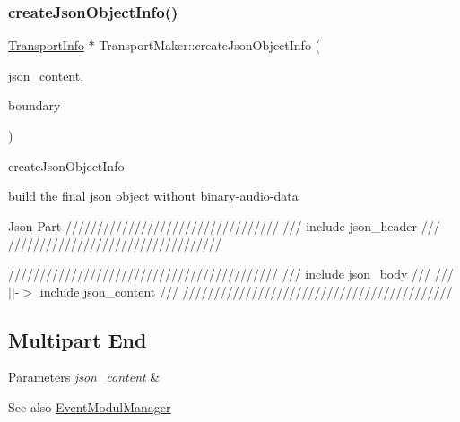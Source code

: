 \subsubsection{\texorpdfstring{create\+Json\+Object\+Info()}{createJsonObjectInfo()}\hspace{0.1cm}{\footnotesize\ttfamily [1/2]}}
{\footnotesize\ttfamily \hyperlink{classAlexaEvent_1_1TransportInfo}{Transport\+Info} $\ast$ Transport\+Maker\+::create\+Json\+Object\+Info (\begin{DoxyParamCaption}\item[{\hyperlink{classAlexaEvent_1_1TransportInfo}{Transport\+Info} $\ast$}]{json\+\_\+content,  }\item[{const char $\ast$}]{boundary }\end{DoxyParamCaption})}



create\+Json\+Object\+Info 

build the final json object without binary-\/audio-\/data


\begin{DoxyEnumerate}
\item Json Part ////////////////////////////////// /// include json\+\_\+header /// //////////////////////////////////
\end{DoxyEnumerate}

/////////////////////////////////////////// /// include json\+\_\+body /// /// $\vert$$\vert$-\/$>$ include json\+\_\+content /// ///////////////////////////////////////////

\subsection*{Multipart End}


\begin{DoxyParams}{Parameters}
{\em json\+\_\+content} & \\
\hline
\end{DoxyParams}
\begin{DoxySeeAlso}{See also}
\hyperlink{classAlexaEvent_1_1EventModulManager}{Event\+Modul\+Manager} 
\end{DoxySeeAlso}

